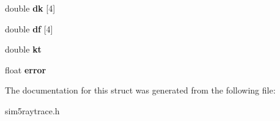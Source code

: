 \begin{DoxyCompactItemize}
double {\bfseries dk} \mbox{[}4\mbox{]}
\item 
\mbox{\label{structraytrace__data_ac90ad030f74f82cc727ba6cc31d24f09}} 
double {\bfseries df} \mbox{[}4\mbox{]}
\item 
\mbox{\label{structraytrace__data_a580f23610ab04e4819cc4ea7a94010e9}} 
double {\bfseries kt}
\item 
\mbox{\label{structraytrace__data_ac5957122a4723423faa54095a14216ed}} 
float {\bfseries error}
\end{DoxyCompactItemize}


The documentation for this struct was generated from the following file\+:\begin{DoxyCompactItemize}
\item 
sim5raytrace.\+h\end{DoxyCompactItemize}
